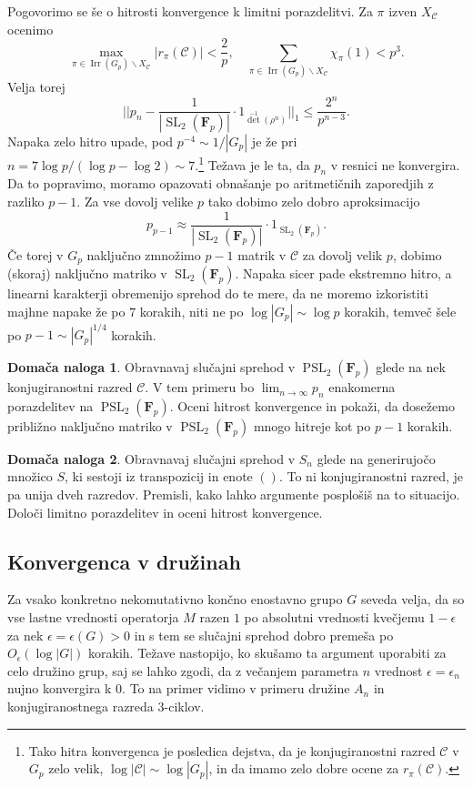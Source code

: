 \documentclass[11pt]{book}
\def\conclass{\mathcal{C}}
\def\FF{\mathbf{F}}
\DeclareMathOperator\Irr{Irr}
\DeclareMathOperator\SL{SL}
\DeclareMathOperator\PSL{PSL}
\theoremstyle{definition}
\theoremstyle{zgled}
\theoremstyle{odprtproblem}
\theoremstyle{domacanaloga}
\newtheorem*{domacanaloga}{Domača naloga}
\theoremstyle{izrek}
\begin{document}
Pogovorimo se še o hitrosti konvergence k limitni porazdelitvi. Za $\pi$ izven $X_{\conclass}$ ocenimo
\[
    \max_{\pi \in \Irr(G_p) \backslash X_{\conclass}} |r_{\pi}(\conclass)| < \frac{2}{p}, \quad
    \sum_{\pi \in \Irr(G_p) \backslash X_{\conclass}} \chi_{\pi}(1)
    < p^3.
\]
Velja torej
\[
    || p_n - \frac{1}{|\SL_2(\FF_p)|} \cdot 1_{\det^{-1}(\rho^n)} ||_1
    \leq
    \frac{2^n}{p^{n-3}}.
\]
Napaka zelo hitro upade, pod $p^{-4} \sim 1/|G_p|$ je že pri $n = 7 \log p / (\log p - \log 2) \sim 7$.\footnote{Tako hitra konvergenca je posledica dejstva, da je konjugiranostni razred $\conclass$ v $G_p$ zelo velik, $\log |\conclass| \sim \log |G_p|$, in da imamo zelo dobre ocene za $r_{\pi}(\conclass)$.} Težava je le ta, da $p_n$ v resnici ne konvergira. Da to popravimo, moramo opazovati obnašanje po aritmetičnih zaporedjih z razliko $p-1$. Za vse dovolj velike $p$ tako dobimo zelo dobro aproksimacijo
\[
    p_{p-1} \approx \frac{1}{|\SL_2(\FF_p)|} \cdot 1_{\SL_2(\FF_p)}.
\]
Če torej v $G_p$ naključno zmnožimo $p-1$ matrik v $\conclass$ za dovolj velik $p$, dobimo (skoraj) naključno matriko v $\SL_2(\FF_p)$. Napaka sicer pade ekstremno hitro, a linearni karakterji obremenijo sprehod do te mere, da ne moremo izkoristiti majhne napake že po $7$ korakih, niti ne po $\log |G_p| \sim \log p$ korakih, temveč šele po $p-1 \sim |G_p|^{1/4}$ korakih. 

\begin{domacanaloga}
Obravnavaj slučajni sprehod v $\PSL_2(\FF_p)$ glede na nek konjugiranostni razred $\conclass$. V tem primeru bo $\lim_{n \to \infty} p_n$ enakomerna porazdelitev na $\PSL_2(\FF_p)$. Oceni hitrost konvergence in pokaži, da dosežemo približno naključno matriko v $\PSL_2(\FF_p)$ mnogo hitreje kot po $p-1$ korakih.
\end{domacanaloga}

\begin{domacanaloga}
Obravnavaj slučajni sprehod v $S_n$ glede na generirujočo množico $S$, ki sestoji iz transpozicij in enote $()$. To ni konjugiranostni razred, je pa unija dveh razredov. Premisli, kako lahko argumente posplošiš na to situacijo. Določi limitno porazdelitev in oceni hitrost konvergence.
\end{domacanaloga}

\subsection{Konvergenca v družinah}

Za vsako konkretno nekomutativno končno enostavno grupo $G$ seveda velja, da so vse lastne vrednosti operatorja $M$ razen $1$ po absolutni vrednosti kvečjemu $1-\epsilon$ za nek $\epsilon = \epsilon(G) > 0$ in s tem se slučajni sprehod dobro premeša po $O_{\epsilon}(\log |G|)$ korakih. Težave nastopijo, ko skušamo ta argument uporabiti za celo družino grup, saj se lahko zgodi, da z večanjem parametra $n$ vrednost $\epsilon = \epsilon_n$ nujno konvergira k $0$. To na primer vidimo v primeru družine $A_n$ in konjugiranostnega razreda $3$-ciklov. 
\end{document}
